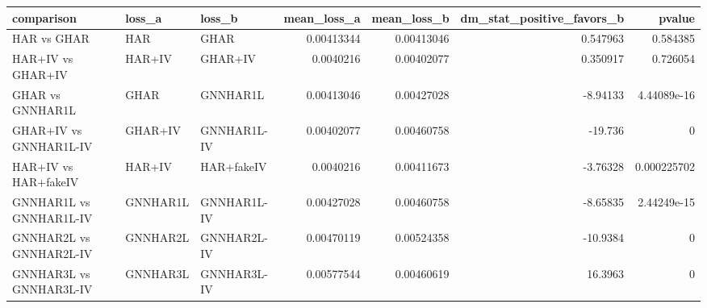 \begin{tabular}{lllrrrr}
\toprule
comparison & loss_a & loss_b & mean_loss_a & mean_loss_b & dm_stat_positive_favors_b & pvalue \\
\midrule
HAR vs GHAR & HAR & GHAR & 0.00413344 & 0.00413046 & 0.547963 & 0.584385 \\
HAR+IV vs GHAR+IV & HAR+IV & GHAR+IV & 0.0040216 & 0.00402077 & 0.350917 & 0.726054 \\
GHAR vs GNNHAR1L & GHAR & GNNHAR1L & 0.00413046 & 0.00427028 & -8.94133 & 4.44089e-16 \\
GHAR+IV vs GNNHAR1L-IV & GHAR+IV & GNNHAR1L-IV & 0.00402077 & 0.00460758 & -19.736 & 0 \\
HAR+IV vs HAR+fakeIV & HAR+IV & HAR+fakeIV & 0.0040216 & 0.00411673 & -3.76328 & 0.000225702 \\
GNNHAR1L vs GNNHAR1L-IV & GNNHAR1L & GNNHAR1L-IV & 0.00427028 & 0.00460758 & -8.65835 & 2.44249e-15 \\
GNNHAR2L vs GNNHAR2L-IV & GNNHAR2L & GNNHAR2L-IV & 0.00470119 & 0.00524358 & -10.9384 & 0 \\
GNNHAR3L vs GNNHAR3L-IV & GNNHAR3L & GNNHAR3L-IV & 0.00577544 & 0.00460619 & 16.3963 & 0 \\
\bottomrule
\end{tabular}
